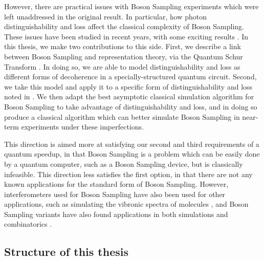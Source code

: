However, there are practical issues with Boson Sampling experiments which were left unaddressed in the original result. In particular, how photon distinguishability and loss affect the classical complexity of Boson Sampling. These issues have been studied in recent years, with some exciting results \cite{garciapatron2017, renema2018, renema2018loss, oszmaniec2018, brod2019}. In this thesis, we make two contributions to this side. First, we describe a link between Boson Sampling and representation theory, via the Quantum Schur Transform \cite{bacon2004, harrow2005, bacon2007}. In doing so, we are able to model distinguishability and loss as different forms of decoherence in a specially-structured quantum circuit. Second, we take this model and apply it to a specific form of distinguishability and loss noted in \cite{renema2018, renema2018loss}. We then adapt the best asymptotic classical simulation algorithm for Boson Sampling \cite{clifford2017} to take advantage of distinguishability and loss, and in doing so produce a classical algorithm which can better simulate Boson Sampling in near-term experiments under these imperfections.

This direction is aimed more at satisfying our second and third requirements of a quantum speedup, in that Boson Sampling is a problem which can be easily done by a quantum computer, such as a Boson Sampling device, but is classically infeasible. This direction less satisfies the first option, in that there are not any known applications for the standard form of Boson Sampling. However, interferometers used for Boson Sampling have also been used for other applications, such as simulating the vibronic spectra of molecules \cite{sparrow2018}, and Boson Sampling variants have also found applications in both simulations and combinatorics \cite{huh2015, bradler2018, schuld2019}.

\subsection{Structure of this thesis}

